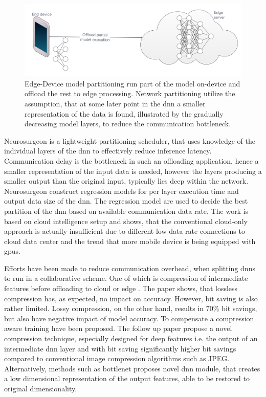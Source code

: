 \begin{figure}
	\centering
	\includegraphics[width=\linewidth]{figures/models/partitioning}
	\caption[Model partitioning]{Edge-Device model partitioning run part of the model on-device and offload the rest to edge processing. Network partitioning utilize the assumption, that at some later point in the \gls{dnn} a smaller representation of the data is found, illustrated by the gradually decreasing model layers, to reduce the communication bottleneck. }
	\label{fig:offlaoding}
\end{figure}

Neurosurgeon \cite{kang_neurosurgeon:_2017} is a lightweight partitioning scheduler, that uses knowledge of the individual layers of the \gls{dnn} to effectively reduce inference latency. Communication delay is the bottleneck in such an offloading application, hence a smaller representation of the input data is needed, however the layers producing a smaller output than the original input, typically lies deep within the network. Neurosurgeon construct regression models for per layer execution time and output data size of the \gls{dnn}. The regression model are used to decide the best partition of the \gls{dnn} based on available communication data rate. The work is based on cloud intelligence setup and shows, that the conventional cloud-only approach is actually insufficient due to different low data rate connections to cloud data center and the trend that more mobile device is being equipped with \gls{gpu}s. 

Efforts have been made to reduce communication overhead, when splitting \gls{dnn}s to run in a collaborative scheme. One of which is compression of intermediate features before offloading to cloud or edge \cite{choi_deep_2018}. The paper shows, that lossless compression has, as expected, no impact on accuracy. However, bit saving is also rather limited. Lossy compression, on the other hand, results in 70\% bit savings, but also have negative impact of model accuracy. To compensate a compression aware training have been proposed. The follow up paper \cite{choi_near-lossless_2018} propose a novel compression technique, especially designed for deep features i.e. the output of an intermediate \gls{dnn} layer and with bit saving significantly higher bit savings compared to conventional image compression algorithms such as JPEG. Alternatively, methods such as \gls{bottlenet} proposes novel \gls{dnn} module, that creates a low dimensional representation of the output features, able to be restored to original dimensionality. 

